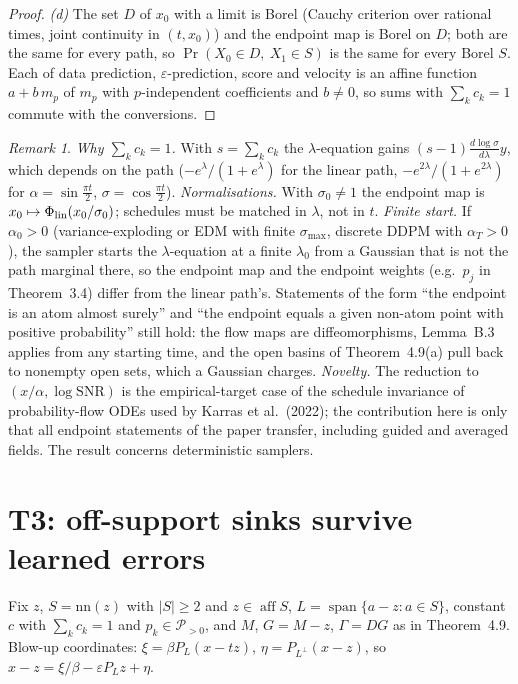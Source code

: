 \documentclass[11pt]{article}
\theoremstyle{definition}
\theoremstyle{remark}
\newtheorem{remark}[theorem]{Remark}
\newcommand{\Ppos}{\mathcal P_{>0}}
\newcommand{\nn}{\mathrm{nn}}
\newcommand{\eps}{\varepsilon}
\DeclareMathOperator{\aff}{aff}
\begin{document}
\begin{proof}
\emph{(d)} The set $D$ of $x_0$ with a limit is Borel (Cauchy criterion over rational times, joint
continuity in $(t,x_0)$) and the endpoint map is Borel on $D$; both are the same for every path, so
$\Pr(X_0\in D,\ X_1\in S)$ is the same for every Borel $S$. Each of data prediction, $\eps$-prediction,
score and velocity is an affine function $a+b\,m_p$ of $m_p$ with $p$-independent coefficients and
$b\ne0$, so sums with $\sum_kc_k=1$ commute with the conversions.
\end{proof}

\begin{remark}
\emph{Why $\sum_kc_k=1$.} With $s=\sum_kc_k$ the $\lambda$-equation gains $(s-1)\frac{d\log\sigma}{d\lambda}y$,
which depends on the path ($-e^\lambda/(1+e^\lambda)$ for the linear path, $-e^{2\lambda}/(1+e^{2\lambda})$ for
$\alpha=\sin\frac{\pi t}2$, $\sigma=\cos\frac{\pi t}2$). \emph{Normalisations.} With $\sigma_0\ne1$ the endpoint
map is $x_0\mapsto\Phi_{\rm lin}(x_0/\sigma_0)$; schedules must be matched in $\lambda$, not in $t$.
\emph{Finite start.} If $\alpha_0>0$ (variance-exploding or EDM with finite $\sigma_{\max}$, discrete
DDPM with $\alpha_T>0$), the sampler starts the $\lambda$-equation at a finite $\lambda_0$ from a Gaussian
that is not the path marginal there, so the endpoint map and the endpoint weights (e.g.\ $p_j$ in
Theorem~3.4) differ from the linear path's. Statements of the form ``the endpoint is an atom almost
surely'' and ``the endpoint equals a given non-atom point with positive probability'' still hold:
the flow maps are diffeomorphisms, Lemma~B.3 applies from any starting time, and the open basins of
Theorem~4.9(a) pull back to nonempty open sets, which a Gaussian charges.
\emph{Novelty.} The reduction to $(x/\alpha,\log\text{SNR})$ is the empirical-target case of the schedule
invariance of probability-flow ODEs used by Karras et al.\ (2022); the contribution here is only
that all endpoint statements of the paper transfer, including guided and averaged fields. The result
concerns deterministic samplers.
\end{remark}

\section{T3: off-support sinks survive learned errors}
\label{sec:t3}

Fix $z$, $S=\nn(z)$ with $|S|\ge2$ and $z\in\aff S$, $L=\operatorname{span}\{a-z:a\in S\}$, constant $c$ with
$\sum_kc_k=1$ and $p_k\in\Ppos$, and $M$, $G=M-z$, $\Gamma=DG$ as in Theorem~4.9. Blow-up coordinates:
$\xi=\beta P_L(x-tz)$, $\eta=P_{L^\perp}(x-z)$, so $x-z=\xi/\beta-\eps P_Lz+\eta$.
\end{document}
